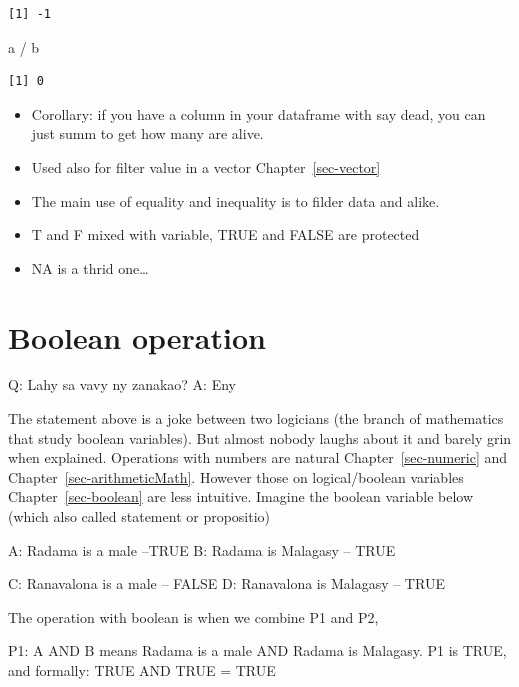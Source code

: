 \documentclass[
  letterpaper,
  DIV=11,
  numbers=noendperiod]{scrreprt}
\newenvironment{Shaded}{\begin{snugshade}}{\end{snugshade}}
\newcommand{\NormalTok}[1]{\textcolor[rgb]{0.00,0.23,0.31}{#1}}
\newcommand{\SpecialCharTok}[1]{\textcolor[rgb]{0.37,0.37,0.37}{#1}}
\providecommand{\tightlist}{%
  \setlength{\itemsep}{0pt}\setlength{\parskip}{0pt}}
\begin{document}
\begin{verbatim}
[1] -1
\end{verbatim}

\begin{Shaded}
\begin{Highlighting}[]
\NormalTok{a }\SpecialCharTok{/}\NormalTok{ b}
\end{Highlighting}
\end{Shaded}

\begin{verbatim}
[1] 0
\end{verbatim}

\begin{itemize}
\tightlist
\item
  Corollary: if you have a column in your dataframe with say dead, you
  can just summ to get how many are alive.
\item
  Used also for filter value in a vector Chapter~\ref{sec-vector}
\item
  The main use of equality and inequality is to filder data and alike.
\item
  T and F mixed with variable, TRUE and FALSE are protected
\item
  NA is a thrid one\ldots{}
\end{itemize}

\chapter{Boolean operation}\label{sec-boolean-operation}

Q: Lahy sa vavy ny zanakao? A: Eny

The statement above is a joke between two logicians (the branch of
mathematics that study boolean variables). But almost nobody laughs
about it and barely grin when explained. Operations with numbers are
natural Chapter~\ref{sec-numeric} and Chapter~\ref{sec-arithmeticMath}.
However those on logical/boolean variables Chapter~\ref{sec-boolean} are
less intuitive. Imagine the boolean variable below (which also called
statement or propositio)

A: Radama is a male --TRUE B: Radama is Malagasy -- TRUE

C: Ranavalona is a male -- FALSE D: Ranavalona is Malagasy -- TRUE

The operation with boolean is when we combine P1 and P2,

P1: A AND B means Radama is a male AND Radama is Malagasy. P1 is TRUE,
and formally: TRUE AND TRUE = TRUE
\end{document}
